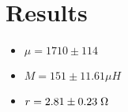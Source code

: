 \section{Results}
	\begin{itemize}
		\item $\mu = 1710\pm114$
		\item $M = 151\pm11.61\mu H$
		\item $r = 2.81\pm0.23\;\ohm$
	\end{itemize}